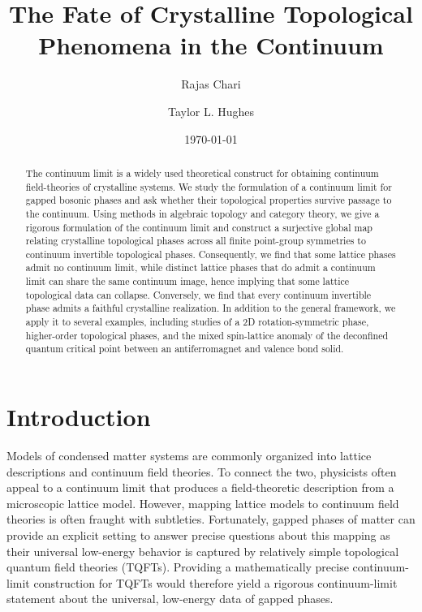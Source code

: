 \documentclass[aps,prx,reprint,superscriptaddress,twocolumn,amsmath,amssymb,amsfonts, nofootinbib]{revtex4-2}
\theoremstyle{apsstyle}
\begin{document}
\title{The Fate of Crystalline Topological Phenomena in the Continuum}
\author{Rajas Chari} 
\author{Taylor L. Hughes} 



\begin{abstract}
    The continuum limit is a widely used theoretical construct for obtaining continuum field-theories of crystalline systems. We study the formulation of a continuum limit for gapped bosonic phases and ask whether their topological properties survive passage to the continuum. Using methods in algebraic topology and category theory, we give a rigorous formulation of the continuum limit and construct a surjective global map relating crystalline topological phases across all finite point-group symmetries to continuum invertible topological phases. Consequently, we find that some lattice phases admit no continuum limit, while distinct lattice phases that do admit a continuum limit can share the same continuum image, hence implying that some lattice topological data can collapse. Conversely, we find that every continuum invertible phase admits a faithful crystalline realization. In addition to the general framework, we apply it to several examples, including studies of a 2D rotation-symmetric phase, higher-order topological phases, and the mixed spin-lattice anomaly of the deconfined quantum critical point between an antiferromagnet and valence bond solid.
\end{abstract}
\date{\today}

\maketitle 
\makeatletter
\let\oldl@subsubsection\l@subsubsection
\renewcommand{\l@subsubsection}[2]{}
\makeatother

\tableofcontents

\section{Introduction}\label{sec:intro}Models of condensed matter systems are commonly organized into lattice descriptions and continuum field theories. To connect the two, physicists often appeal to a continuum limit that produces a field-theoretic description from a microscopic lattice model. However, mapping lattice models to continuum field theories is often fraught with subtleties. Fortunately, gapped phases of matter can provide an explicit setting to answer precise questions about this mapping as their universal low-energy behavior is captured by relatively simple topological quantum field theories (TQFTs). Providing a mathematically precise continuum-limit construction for TQFTs would therefore yield a rigorous continuum-limit statement about the universal, low-energy data of gapped phases. 
\end{document}
